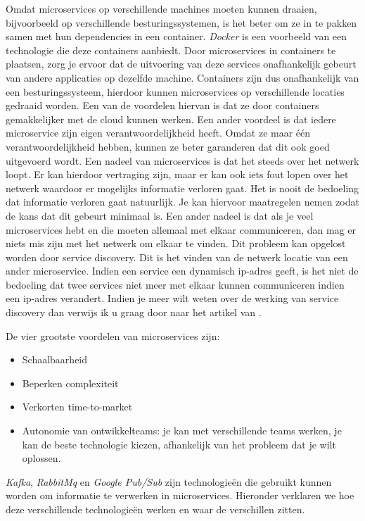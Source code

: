 Omdat microservices op verschillende machines moeten kunnen draaien, bijvoorbeeld op verschillende besturingssystemen, is het beter om ze in te pakken samen met hun dependencies in een container. \emph{Docker} is een voorbeeld van een technologie die deze containers aanbiedt. Door microservices in containers te plaatsen, zorg je ervoor dat de uitvoering van deze services onafhankelijk gebeurt van andere applicaties op dezelfde machine. Containers zijn dus onafhankelijk van een besturingssysteem, hierdoor kunnen microservices op verschillende locaties gedraaid worden. Een van de voordelen hiervan is dat ze door containers gemakkelijker met de cloud kunnen werken. Een ander voordeel is dat iedere microservice zijn eigen verantwoordelijkheid heeft. Omdat ze maar één verantwoordelijkheid hebben, kunnen ze beter garanderen dat dit ook goed uitgevoerd wordt. Een nadeel van microservices is dat het steeds over het netwerk loopt. Er kan hierdoor vertraging zijn, maar er kan ook iets fout lopen over het netwerk waardoor er mogelijks informatie verloren gaat. Het is nooit de bedoeling dat informatie verloren gaat natuurlijk. Je kan hiervoor maatregelen nemen zodat de kans dat dit gebeurt minimaal is. Een ander nadeel is dat als je veel microservices hebt en die moeten allemaal met elkaar communiceren, dan mag er niets mis zijn met het netwerk om elkaar te vinden. Dit probleem kan opgelost worden door service discovery. Dit is het vinden van de netwerk locatie van een ander microservice. Indien een service een dynamisch ip-adres geeft, is het niet de bedoeling dat twee services niet meer met elkaar kunnen communiceren indien een ip-adres verandert. Indien je meer wilt weten over de werking van service discovery dan verwijs ik u graag door naar het artikel van \textcite{Xu2019}.

De vier grootste voordelen van microservices zijn: 
\begin{itemize}
    \item Schaalbaarheid
    \item Beperken complexiteit
    \item Verkorten time-to-market
    \item Autonomie van ontwikkelteams: je kan met verschillende teams werken, je kan de beste technologie kiezen, afhankelijk van het probleem dat je wilt oplossen.
\end{itemize}

\emph{Kafka}, \emph{RabbitMq} en \emph{Google Pub/Sub} zijn technologieën die gebruikt kunnen worden om informatie te verwerken in microservices. Hieronder verklaren we hoe deze verschillende technologieën werken en waar de verschillen zitten.

